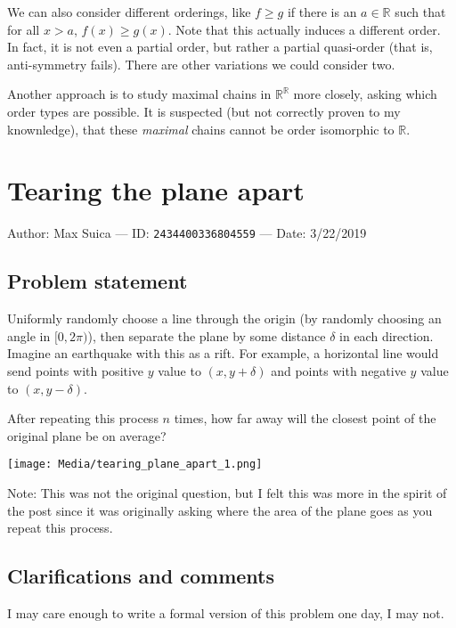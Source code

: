 \documentclass[10pt]{article}
\begin{document}
We can also consider different orderings, like $f\geq g$ if there is an $a\in\mathbb{R}$ such that for all $x>a$, $f(x)\geq g(x)$. Note that this actually induces a different order. In fact, it is not even a partial order, but rather a partial quasi-order (that is, anti-symmetry fails). There are other variations we could consider two.

Another approach is to study maximal chains in $\mathbb{R}^\mathbb{R}$ more closely, asking which order types are possible. It is suspected (but not correctly proven to my knownledge), that these \textit{maximal} chains cannot be order isomorphic to $\mathbb{R}$.

\pagebreak

\section{Tearing the plane apart}

Author: Max Suica --- ID: \verb`2434400336804559` --- Date: 3/22/2019

\subsection{Problem statement}

Uniformly randomly choose a line through the origin (by randomly choosing an angle in $[0,2\pi)$), then separate the plane by some distance $\delta$ in each direction. Imagine an earthquake with this as a rift. For example, a horizontal line would send points with positive $y$ value to $(x,y+\delta)$ and points with negative $y$ value to $(x,y-\delta)$.

After repeating this process $n$ times, how far away will the closest point of the original plane be on average?

\BlankLine

\texttt{[image: Media/tearing\_plane\_apart\_1.png]}

Note: This was not the original question, but I felt this was more in the spirit of the post since it was originally asking where the area of the plane goes as you repeat this process.

\subsection{Clarifications and comments}

I may care enough to write a formal version of this problem one day, I may not.
\end{document}
